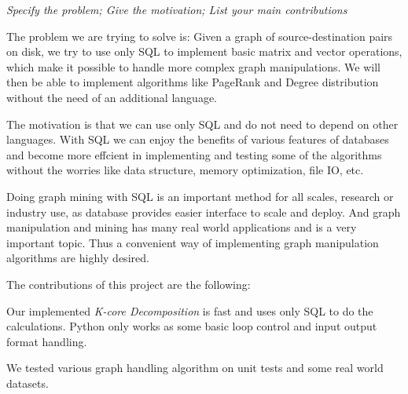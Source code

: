 {\small \em Specify the problem; Give the motivation; 
List your main contributions}

The problem we are trying to solve is: Given a graph of source-destination pairs on disk, we try to use only SQL to implement basic matrix and vector operations, which make it possible to handle more complex graph manipulations. We will then be able to implement algorithms like PageRank and Degree distribution without the need of an additional language.

The motivation is that we can use only SQL and do not need to depend on other languages. With SQL we can enjoy the benefits of various features of databases and become more effcient in implementing and testing some of the algorithms without the worries like data structure, memory optimization, file IO, etc.

Doing graph mining with SQL is an important method for all scales, research or industry use, as database provides easier interface to scale and deploy. And graph manipulation and mining has many real world applications and is a very important topic. Thus a convenient way of implementing graph manipulation algorithms are highly desired.

The contributions of this project are the following:
\bit
\item Our implemented {\em K-core Decomposition} is fast and uses only SQL to do the calculations. Python only works as 
some basic loop control and input output format handling.
\item We tested various graph handling algorithm on unit tests and some real world datasets.
\eit
